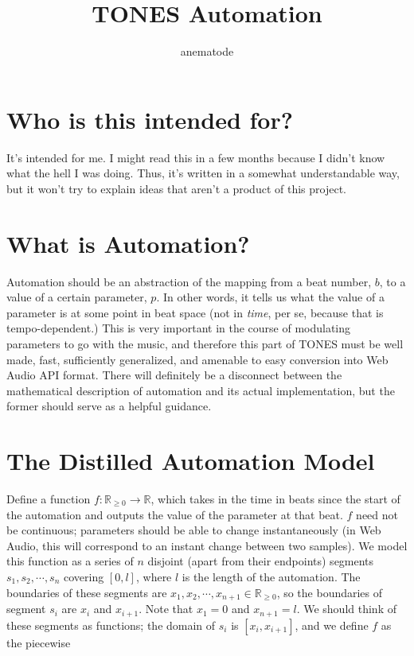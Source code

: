 \documentclass{article}
\begin{document}
\title{TONES Automation}

\author{anematode}

\maketitle

\section{Who is this intended for?}

It's intended for me. I might read this in a few months because I didn't know what the hell I was doing. Thus, it's written in a somewhat understandable way, but it won't try to explain ideas that aren't a product of this project.

\section{What is Automation?}

Automation should be an abstraction of the mapping from a beat number, $b$, to a value of a certain parameter, $p$. In other words, it tells us what the value of a parameter is at some point in beat space (not in \textit{time}, per se, because that is tempo-dependent.) This is very important in the course of modulating parameters to go with the music, and therefore this part of TONES must be well made, fast, sufficiently generalized, and amenable to easy conversion into Web Audio API format. There will definitely be a disconnect between the mathematical description of automation and its actual implementation, but the former should serve as a helpful guidance.

\section{The Distilled Automation Model}

Define a function $f:\mathbb{R}_{\geq 0}\to \mathbb{R}$, which takes in the time in beats since the start of the automation and outputs the value of the parameter at that beat. $f$ need not be continuous; parameters should be able to change instantaneously (in Web Audio, this will correspond to an instant change between two samples). We model this function as a series of $n$ disjoint (apart from their endpoints) segments $s_1, s_2, \cdots, s_n$ covering $[0, l]$, where $l$ is the length of the automation. The boundaries of these segments are $x_1, x_2, \cdots, x_{n+1}\in \mathbb{R}_{\geq 0}$, so the boundaries of segment $s_i$ are $x_i$ and $x_{i+1}$. Note that $x_1 = 0$ and $x_{n+1}=l$. We should think of these segments as functions; the domain of $s_i$ is $[x_i, x_{i+1}]$, and we define $f$ as the piecewise
\end{document}
